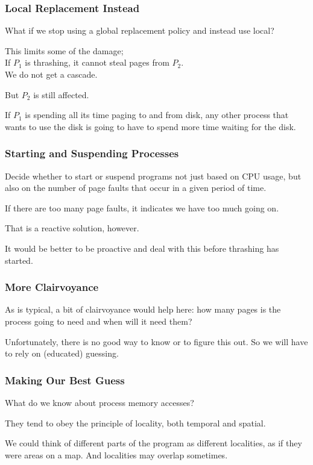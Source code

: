 \begin{frame}
\frametitle{Local Replacement Instead}

What if we stop using a global replacement policy and instead use local? 

This limits some of the damage;\\
\quad If $P_{1}$ is thrashing, it cannot steal pages from $P_{2}$.\\
\quad We do not get a cascade.

But $P_{2}$ is still affected.

If $P_{1}$ is spending all its time paging to and from disk, any other process that wants to use the disk is going to have to spend more time waiting for the disk.


\end{frame}

\begin{frame}
\frametitle{Starting and Suspending Processes}

Decide whether to start or suspend programs not just based on CPU usage, but also on the number of page faults that occur in a given period of time. 

If there are too many page faults, it indicates we have too much going on. 

That is a reactive solution, however. 

It would be better to be proactive and deal with this before thrashing has started.


\end{frame}

\begin{frame}
\frametitle{More Clairvoyance}

As is typical, a bit of clairvoyance would help here: how many pages is the process going to need and when will it need them? 

Unfortunately, there is no good way to know or to figure this out. So we will have to rely on (educated) guessing.

\end{frame}

\begin{frame}
\frametitle{Making Our Best Guess}

What do we know about process memory accesses? 

They tend to obey the principle of locality, both temporal and spatial.

We could think of different parts of the program as different localities, as if they were areas on a map. And localities may overlap sometimes. 

\end{frame}

